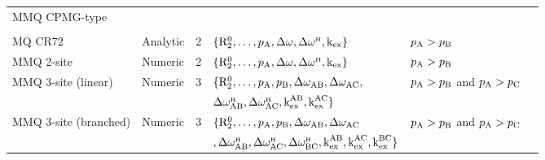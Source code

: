 \begin{landscape}
\begin{center}
\begin{small}
\begin{longtable}{llllll}
\clearpage
MMQ CPMG-type \\
\cline{1-1}
\\[-5pt]
MQ CR72                  & Analytic & 2     & $\{\Rtwozero, \dots, \pA, \dw, \dwH, \kex\}$        & $\pA > \pB$                       & \citet{Korzhnev04a} \\
MMQ 2-site               & Numeric  & 2     & $\{\Rtwozero, \dots, \pA, \dw, \dwH, \kex\}$        & $\pA > \pB$                       & \citet{Korzhnev05} \\
MMQ 3-site (linear)\footnotemark[1]      & Numeric  & 3     & $\{\Rtwozero, \dots, \pA, \pB, \dwAB, \dwAC,$       & $\pA > \pB$ and $\pA > \pC$       & \citet{Korzhnev05} \\
                         &          &       & $\dwHAB, \dwHAC, \kexAB, \kexAC\}$ \\
MMQ 3-site (branched)\footnotemark[1]    & Numeric  & 3     & $\{\Rtwozero, \dots, \pA, \pB, \dwAB, \dwAC$        & $\pA > \pB$ and $\pA > \pC$       & \citet{Korzhnev05} \\
                         &          &       & $, \dwHAB, \dwHAC, \dwHBC, \kexAB, \kexAC, \kexBC\}$ \\


\end{longtable}
\end{small}
\end{center}
\end{landscape}
